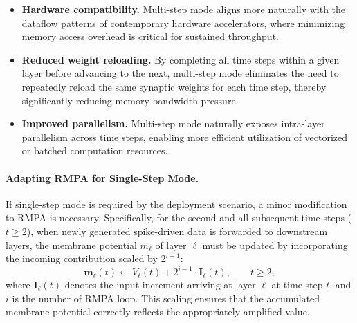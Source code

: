 \begin{itemize}[leftmargin=*, nosep]
    \item \textbf{Hardware compatibility.} Multi-step mode aligns more naturally with 
    the dataflow patterns of contemporary hardware accelerators, where minimizing 
    memory access overhead is critical for sustained throughput.

    \item \textbf{Reduced weight reloading.} By completing all time steps within a 
    given layer before advancing to the next, multi-step mode eliminates the need to 
    repeatedly reload the same synaptic weights for each time step, thereby 
    significantly reducing memory bandwidth pressure.

    \item \textbf{Improved parallelism.} Multi-step mode naturally exposes 
    intra-layer parallelism across time steps, enabling more efficient utilization of 
    vectorized or batched computation resources.
\end{itemize}

\paragraph{Adapting RMPA for Single-Step Mode.}
If single-step mode is required by the deployment scenario, a minor modification to 
RMPA is necessary. Specifically, for the second and all subsequent time steps 
($t \geq 2$), when newly generated spike-driven data is forwarded to downstream 
layers, the membrane potential $m_\ell$ of layer $\ell$ must be updated by incorporating 
the incoming contribution scaled by $2^{i-1}$:
\begin{equation}
    \mathbf{m}_\ell(t) \leftarrow V_\ell(t) + 2^{i-1} \cdot \mathbf{I}_\ell(t), \qquad t \geq 2,
\end{equation}
where $\mathbf{I}_\ell(t)$ denotes the input increment arriving at layer $\ell$ at time step $t$, 
and $i$ is the number of RMPA loop. This scaling ensures that the accumulated membrane 
potential correctly reflects the appropriately amplified value.


